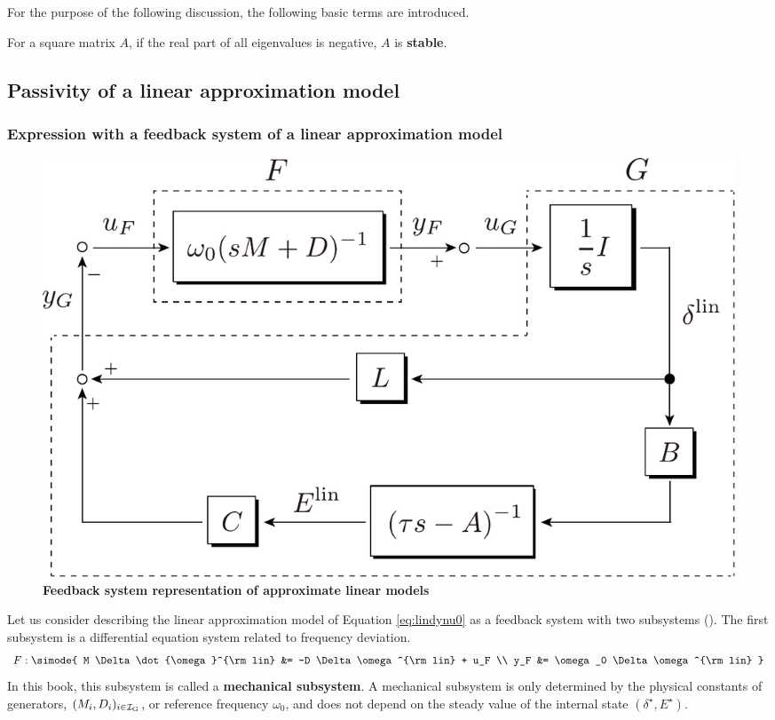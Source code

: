 \documentclass[tombow,dvipdfmx]{corona-a5-1.1}
\begin{document}
For the purpose of the following discussion, the following basic terms are introduced.

\begin{定義}
\label{def:matsta}
For a square matrix $A$, if the real part of all eigenvalues is negative, $A$ is \textbf{stable}.
\end{定義}

\subsection{Passivity of a linear approximation model\advanced}\label{sec:linpasana}

\smallskip
\subsubsection{Expression with a feedback system of a linear approximation model}

\begin{figure}[t]
\centering
\includegraphics[width = .7\linewidth]{figs/FandG}
\medskip
\caption{\textbf{Feedback system representation of approximate linear models}}
\label{fig:GandG}
\medskip
\end{figure}


Let us consider describing the linear approximation model of Equation \ref{eq:lindynu0} as a feedback system with two subsystems ().
The first subsystem is a differential equation system related to frequency deviation.
\begin{align}\label{eq:Fss}
F: \simode{
M \Delta \dot{\omega}^{\rm lin} &= -D \Delta \omega^{\rm lin}
+
u_F \\
y_F &= \omega_0 \Delta \omega^{\rm lin}
}
\end{align}
In this book, this subsystem is called a \textbf{mechanical subsystem}.
A mechanical subsystem is only determined by the physical constants of generators, $(M_i,D_i)_{i\in \mathcal{I}_{\rm G}}$, or reference frequency $\omega_0$, and does not depend on the steady value of the internal state $(\delta^{\star},E^{\star})$.
\end{document}
